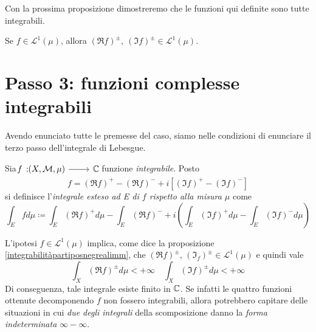 Con la prossima proposizione dimostreremo che le funzioni qui definite sono tutte integrabili.
\begin{proposition}\label{integrabilitàpartiposnegrealimm}
	Se $f\in\mathcal{L}^{1}\left(\mu\right)$, allora $\left(\Re f\right)^{\pm},\ \left(\Im f\right)^{\pm}\in\mathcal{L}^{1}\left(\mu\right)$.
\end{proposition}
\begin{demonstration}
\end{demonstration}
\section{Passo 3: funzioni complesse integrabili}
Avendo enunciato tutte le premesse del caso, siamo nelle condizioni di enunciare il terzo passo dell'integrale di Lebesgue.
\begin{define}
	Sia $\funz{f}{\left(X,\mathcal{M},\mu\right)}{\complexset}$ funzione \textit{integrabile}. Posto
	\begin{equation*}
		f=\left(\Re f\right)^{+}-\left(\Re f\right)^-+i\left[\left(\Im f\right)^{+}-\left(\Im f\right)^{-}\right]
	\end{equation*}
si definisce l'\textit{integrale esteso ad E di $f$ rispetto alla misura $\mu$} come
\begin{equation}
	\int_Efd\mu\coloneqq\int_E\left(\Re f\right)^{+}d\mu-\int_E\left(\Re f\right)^{-}+i\left(\int_E\left(\Im f\right)^{+}d\mu-\int_E\left(\Im f\right)^{-}d\mu\right)
\end{equation}
\end{define}
\begin{observe}
	L'ipotesi $f\in\mathcal{L}^{1}\left(\mu\right)$ implica, come dice la proposizione \ref{integrabilitàpartiposnegrealimm}, che $\left(\Re f\right)^{\pm}$, $\left(\Im_f\right)^{\pm}\in\mathcal{L}^1\left(\mu\right)$ e quindi vale
	\begin{equation*}
		\int_X\left(\Re f\right)^{\pm}d\mu<+\infty\quad \int_X\left(\Im f\right)^{\pm}d\mu<+\infty
	\end{equation*}
	Di conseguenza, tale integrale esiste finito in $\mathbb{C}$. Se infatti le quattro funzioni ottenute decomponendo $f$ non fossero integrabili, allora potrebbero capitare delle situazioni in cui \textit{due degli integrali} della scomposizione danno la \textit{forma indeterminata} $\infty-\infty$.
\end{observe}

